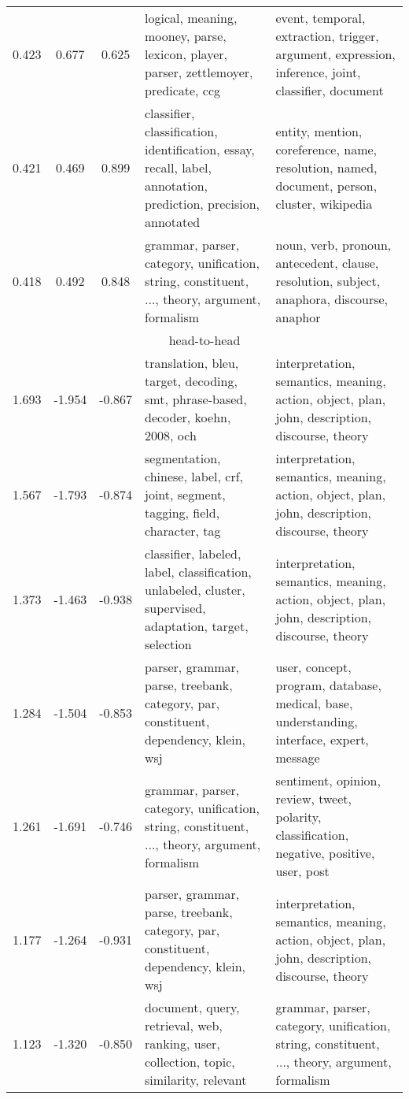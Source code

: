 \begin{tabular}{cccp{5cm}p{5cm}}
0.423 & 0.677 & 0.625 & logical, meaning, mooney, parse, lexicon, player, parser, zettlemoyer, predicate, ccg & event, temporal, extraction, trigger, argument, expression, inference, joint, classifier, document \\
0.421 & 0.469 & 0.899 & classifier, classification, identification, essay, recall, label, annotation, prediction, precision, annotated & entity, mention, coreference, name, resolution, named, document, person, cluster, wikipedia \\
0.418 & 0.492 & 0.848 & grammar, parser, category, unification, string, constituent, ..., theory, argument, formalism & noun, verb, pronoun, antecedent, clause, resolution, subject, anaphora, discourse, anaphor \\
\midrule
\multicolumn{5}{c}{head-to-head}\\
1.693 & -1.954 & -0.867 & translation, bleu, target, decoding, smt, phrase-based, decoder, koehn, 2008, och & interpretation, semantics, meaning, action, object, plan, john, description, discourse, theory \\
1.567 & -1.793 & -0.874 & segmentation, chinese, label, crf, joint, segment, tagging, field, character, tag & interpretation, semantics, meaning, action, object, plan, john, description, discourse, theory \\
1.373 & -1.463 & -0.938 & classifier, labeled, label, classification, unlabeled, cluster, supervised, adaptation, target, selection & interpretation, semantics, meaning, action, object, plan, john, description, discourse, theory \\
1.284 & -1.504 & -0.853 & parser, grammar, parse, treebank, category, par, constituent, dependency, klein, wsj & user, concept, program, database, medical, base, understanding, interface, expert, message \\
1.261 & -1.691 & -0.746 & grammar, parser, category, unification, string, constituent, ..., theory, argument, formalism & sentiment, opinion, review, tweet, polarity, classification, negative, positive, user, post \\
1.177 & -1.264 & -0.931 & parser, grammar, parse, treebank, category, par, constituent, dependency, klein, wsj & interpretation, semantics, meaning, action, object, plan, john, description, discourse, theory \\
1.123 & -1.320 & -0.850 & document, query, retrieval, web, ranking, user, collection, topic, similarity, relevant & grammar, parser, category, unification, string, constituent, ..., theory, argument, formalism \\

\end{tabular}
